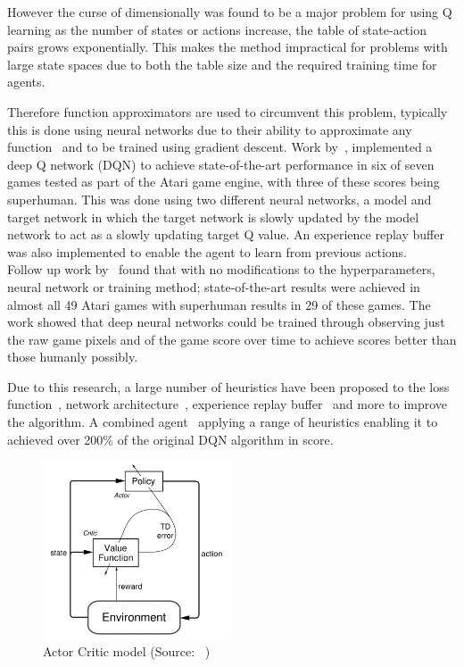 However the curse of dimensionally was found to be a major problem for using Q learning as the number of states
or actions increase, the table of state-action pairs grows exponentially. This makes the method
impractical for problems with large state spaces due to both the table size and the required training time for agents.

Therefore function approximators are used to circumvent this problem, typically this is done using neural networks due
to their ability to approximate any function~\citep{csaji2001approximation} and to be trained using gradient descent.
Work by~\cite{atari}, implemented a deep Q network (DQN) to achieve state-of-the-art performance in six
of seven games tested as part of the Atari game engine, with three of these scores being superhuman. This was done
using two different neural networks, a model and target network in which the target network is slowly
updated by the model network to act as a slowly updating target Q value. An experience replay buffer was also
implemented to enable the agent to learn from previous actions. \\
Follow up work by~\cite{mnih2015humanlevel} found that with no modifications to the hyperparameters, neural network or
training method; state-of-the-art results were achieved in almost all 49 Atari games with superhuman results in 29 of
these games. The work showed that deep neural networks could be trained through observing just the raw game pixels and
of the game score over time to achieve scores better than those humanly possibly.

Due to this research, a large number of heuristics have been proposed to the loss function~\citep{doubledqn},
network architecture~\citep{duelingdqn}, experience replay buffer~\citep{prioritizedexperiencereplay} and more to
improve the algorithm. A combined agent~\citep{rainbow} applying a range of heuristics enabling it to
achieved over 200\% of the original DQN algorithm in score.

\begin{figure}
    \includegraphics[width=0.5\textwidth]{figures/2_background_lit_figs/actor-critic.png}
    \caption{Actor Critic model (Source: ~\cite{Sutton1998})}
    \label{fig:actor-critic-model}
\end{figure}

